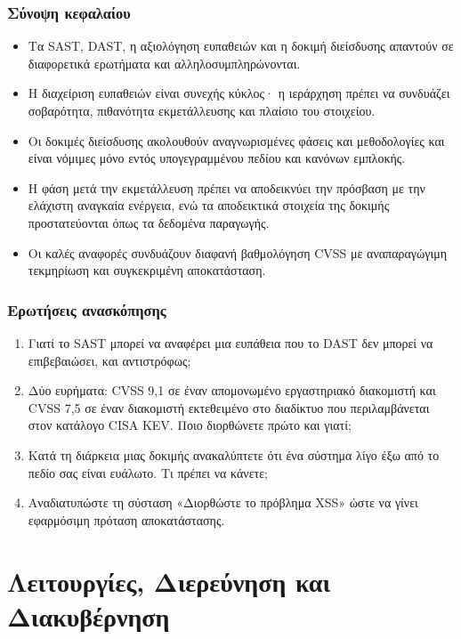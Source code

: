 \documentclass[11pt,openany]{book}
\begin{document}
\section*{Σύνοψη κεφαλαίου}
\begin{itemize}
  \item Τα SAST, DAST, η αξιολόγηση ευπαθειών και η δοκιμή διείσδυσης απαντούν σε διαφορετικά ερωτήματα και αλληλοσυμπληρώνονται.
  \item Η διαχείριση ευπαθειών είναι συνεχής κύκλος· η ιεράρχηση πρέπει να συνδυάζει σοβαρότητα, πιθανότητα εκμετάλλευσης και πλαίσιο του στοιχείου.
  \item Οι δοκιμές διείσδυσης ακολουθούν αναγνωρισμένες φάσεις και μεθοδολογίες και είναι νόμιμες μόνο εντός υπογεγραμμένου πεδίου και κανόνων εμπλοκής.
  \item Η φάση μετά την εκμετάλλευση πρέπει να αποδεικνύει την πρόσβαση με την ελάχιστη αναγκαία ενέργεια, ενώ τα αποδεικτικά στοιχεία της δοκιμής προστατεύονται όπως τα δεδομένα παραγωγής.
  \item Οι καλές αναφορές συνδυάζουν διαφανή βαθμολόγηση CVSS με αναπαραγώγιμη τεκμηρίωση και συγκεκριμένη αποκατάσταση.
\end{itemize}

\section*{Ερωτήσεις ανασκόπησης}
\begin{enumerate}
  \item Γιατί το SAST μπορεί να αναφέρει μια ευπάθεια που το DAST δεν μπορεί να επιβεβαιώσει, και αντιστρόφως;
  \item Δύο ευρήματα: CVSS 9,1 σε έναν απομονωμένο εργαστηριακό διακομιστή και CVSS 7,5 σε έναν διακομιστή εκτεθειμένο στο διαδίκτυο που περιλαμβάνεται στον κατάλογο CISA KEV. Ποιο διορθώνετε πρώτο και γιατί;
  \item Κατά τη διάρκεια μιας δοκιμής ανακαλύπτετε ότι ένα σύστημα λίγο έξω από το πεδίο σας είναι ευάλωτο. Τι πρέπει να κάνετε;
  \item Αναδιατυπώστε τη σύσταση «Διορθώστε το πρόβλημα XSS» ώστε να γίνει εφαρμόσιμη πρόταση αποκατάστασης.
\end{enumerate}

\part{Λειτουργίες, Διερεύνηση και Διακυβέρνηση}
\end{document}
